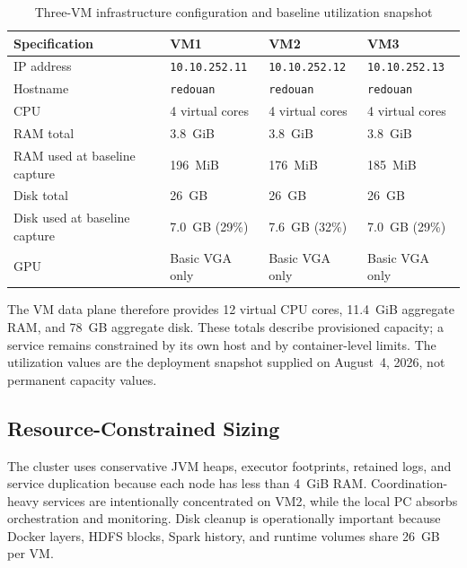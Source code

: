 \begin{table}[htbp]
    \centering
    \footnotesize
    \setlength{\tabcolsep}{3pt}
    \renewcommand{\arraystretch}{1.08}
    \begin{tabularx}{\textwidth}{|p{}|X|X|X|}
        \hline
        \rowcolor{ModernTableHeader}
        \color{white}\textbf{Specification} & \color{white}\textbf{VM1} & \color{white}\textbf{VM2} & \color{white}\textbf{VM3} \\
        \hline
        IP address & \texttt{10.10.252.11} & \texttt{10.10.252.12} & \texttt{10.10.252.13} \\
        \hline
        Hostname & \texttt{redouan} & \texttt{redouan} & \texttt{redouan} \\
        \hline
        CPU & 4 virtual cores & 4 virtual cores & 4 virtual cores \\
        \hline
        RAM total & 3.8~GiB & 3.8~GiB & 3.8~GiB \\
        \hline
        RAM used at baseline capture & 196~MiB & 176~MiB & 185~MiB \\
        \hline
        Disk total & 26~GB & 26~GB & 26~GB \\
        \hline
        Disk used at baseline capture & 7.0~GB (29\%) & 7.6~GB (32\%) & 7.0~GB (29\%) \\
        \hline
        GPU & Basic VGA only & Basic VGA only & Basic VGA only \\
        \hline
    \end{tabularx}
    \caption{Three-VM infrastructure configuration and baseline utilization snapshot}
    \label{tab:implementation-vm-specifications}
\end{table}

The VM data plane therefore provides 12 virtual CPU cores, 11.4~GiB aggregate RAM, and 78~GB aggregate disk. These totals describe provisioned capacity; a service remains constrained by its own host and by container-level limits. The utilization values are the deployment snapshot supplied on August~4, 2026, not permanent capacity values.

\subsection{Resource-Constrained Sizing}
The cluster uses conservative JVM heaps, executor footprints, retained logs, and service duplication because each node has less than 4~GiB RAM. Coordination-heavy services are intentionally concentrated on VM2, while the local PC absorbs orchestration and monitoring. Disk cleanup is operationally important because Docker layers, HDFS blocks, Spark history, and runtime volumes share 26~GB per VM.

